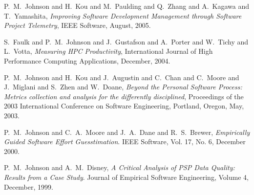 \documentclass[11pt]{article}
\begin{document}
\begin{Publications: Closely Related}

\item P.~M.~Johnson and H.~Kou and M.~Paulding and Q.~Zhang and A.~Kagawa
and T.~Yamashita, {\em Improving Software Development Management through
Software Project Telemetry}, IEEE Software, August, 2005.

\item S.~Faulk and P.~M.~Johnson and J.~Gustafson and A.~Porter and W.~Tichy
and L.~Votta, {\em Measuring HPC Productivity}, International Journal of
High Performance Computing Applications, December, 2004.


\item P.~M.~Johnson and H.~Kou and J.~Augustin and C.~Chan and C.~Moore and
J.~Miglani and S.~Zhen and W.~Doane, {\em Beyond the Personal Software
Process: Metrics collection and analysis for the differently disciplined},
Proceedings of the 2003 International Conference on Software Engineering,
Portland, Oregon, May, 2003.
  
\item P.~M.~Johnson and C.~A.~Moore and J.~A.~Dane and R.~S.~Brewer, {\em
    Empirically Guided Software Effort Guesstimation}.  IEEE Software, Vol.
  17, No. 6, December 2000.
  
\item P.~M.~Johnson and A.~M.~Disney, {\em A Critical Analysis of PSP Data
    Quality: Results from a Case Study}.  Journal of Empirical Software
  Engineering, Volume 4, December, 1999.

\end{Publications: Closely Related}
\end{document}
